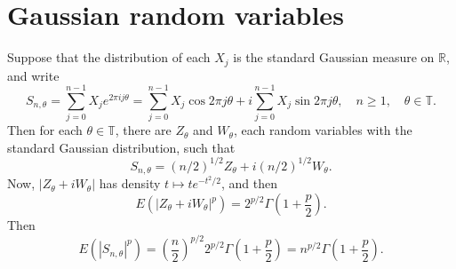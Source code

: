 \documentclass{article}
\begin{document}
\section{Gaussian random variables}
Suppose that the distribution of each $X_j$ is the standard Gaussian measure on $\mathbb{R}$, and write
\[
S_{n,\theta} = \sum_{j=0}^{n-1} X_j e^{2\pi ij\theta} = \sum_{j=0}^{n-1} X_j \cos 2\pi j \theta + i \sum_{j=0}^{n-1} X_j \sin 2\pi j\theta,
\quad n \geq 1, \quad \theta \in \mathbb{T}.
\]
Then for each $\theta \in \mathbb{T}$, there are $Z_\theta$ and $W_\theta$, each random variables with the standard Gaussian distribution,
such that
\[
S_{n,\theta} = (n/2)^{1/2} Z_\theta + i (n/2)^{1/2} W_\theta.
\]
Now, $|Z_\theta+iW_\theta|$ has density $t \mapsto t e^{-t^2/2}$, and then
\[
E(|Z_\theta+iW_\theta|^p) = 2^{p/2} \Gamma\left(1+\frac{p}{2}\right).
\]
Then
\[
E(|S_{n,\theta}|^p) = \left( \frac{n}{2} \right)^{p/2} 2^{p/2} \Gamma\left(1+\frac{p}{2}\right)
=n^{p/2} \Gamma\left(1+\frac{p}{2}\right).
\]




\end{document}
